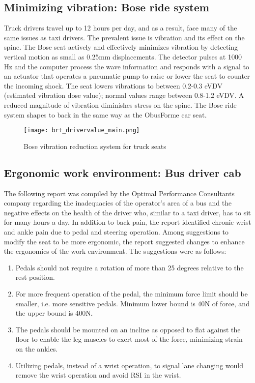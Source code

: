 \documentclass[11pt]{article}
\begin{document}
\subsection{Minimizing vibration: Bose ride system}
Truck drivers travel up to 12 hours per day, and as a result, face many of the same issues as taxi drivers. 
The prevalent issue is vibration and its effect on the spine. The Bose seat actively and effectively minimizes vibration 
by detecting vertical motion as small as 0.25mm displacements. %
The detector pulses at 1000 Hz and the computer process the 
wave information and responds with a signal to an actuator that operates a pneumatic pump to raise or lower the seat to 
counter the incoming shock. The seat lowers vibrations to between 0.2-0.3 eVDV (estimated vibration dose value); normal values range 
between 0.8-1.2 eVDV\cite{Bosetruckseat}. A reduced magnitude of vibration diminishes stress on the spine. The Bose ride system shapes to back in the same way as the 
ObusForme car seat\cite{Bosetruckseat}.
\begin{figure}[h]
  \centering
  \texttt{[image: brt\_drivervalue\_main.png]}
  \caption{Bose vibration reduction system for truck seats}
\end{figure}
\subsection{Ergonomic work environment: Bus driver cab}
The following report was compiled by the Optimal Performance Consultants company regarding the 
inadequacies of the operator's area of a bus and the negative effects on the health of the driver who, similar to a taxi driver, has to sit 
for many hours a day\cite{Ismail2003}. In addition to back pain, the report 
identified chronic wrist and ankle pain due to pedal and steering operation. Among suggestions to modify the 
seat to be more ergonomic, the report suggested changes to enhance the ergonomics of the work environment. 
The suggestions were as follows:
\begin{enumerate}
\item Pedals should not require a rotation of more than 25 degrees relative to the rest position. 
\item For more frequent operation of the pedal, the minimum force limit should be smaller, 
i.e. more sensitive pedals. Minimum lower bound is 40N of force, and the upper bound is 400N.
\item The pedals should be mounted on an incline as opposed to flat against the floor to enable the leg 
muscles to exert most of the force, minimizing strain on the ankles. 
\item Utilizing pedals, instead of a wrist operation, to signal lane changing would remove the wrist operation
and avoid RSI in the wrist.
\end{enumerate}
\end{document}
